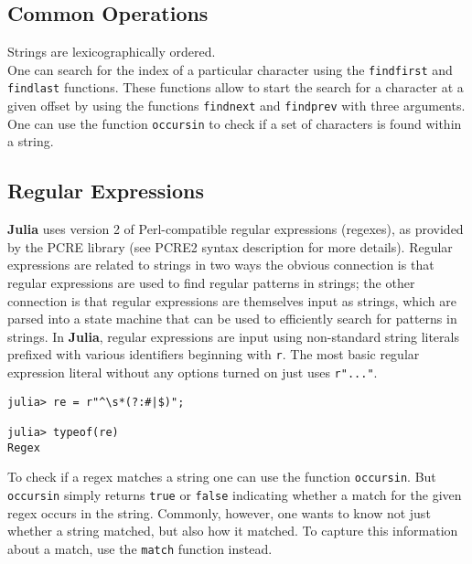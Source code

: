 \documentclass[
]{article}
\begin{document}
\hypertarget{common-operations}{%
\subsection{Common Operations}\label{common-operations}}

Strings are lexicographically ordered.\\
One can search for the index of a particular character using the
\texttt{findfirst} and \texttt{findlast} functions. These functions
allow to start the search for a character at a given offset by using the
functions \texttt{findnext} and \texttt{findprev} with three
arguments.\\
One can use the function \texttt{occursin} to check if a set of characters is
found within a string.

\hypertarget{regular-expressions}{%
\subsection{Regular Expressions}\label{regular-expressions}}

\textbf{Julia} uses version 2 of Perl-compatible regular expressions
(regexes), as provided by the PCRE library (see PCRE2 syntax description
for more details). Regular expressions are related to strings in two
ways the obvious connection is that regular expressions are used to find
regular patterns in strings; the other connection is that regular
expressions are themselves input as strings, which are parsed into a
state machine that can be used to efficiently search for patterns in
strings. In \textbf{Julia}, regular expressions are input using
non-standard string literals prefixed with various identifiers beginning
with \texttt{r}. The most basic regular expression literal without any
options turned on just uses \texttt{r"..."}.

\begin{verbatim}
julia> re = r"^\s*(?:#|$)";

julia> typeof(re)
Regex
\end{verbatim}

To check if a regex matches a string one can use the function
\texttt{occursin}. But \texttt{occursin} simply returns \texttt{true} or
\texttt{false} indicating whether a match for the given regex occurs in
the string. Commonly, however, one wants to know not just whether a
string matched, but also how it matched. To capture this information
about a match, use the \texttt{match} function instead.
\end{document}
